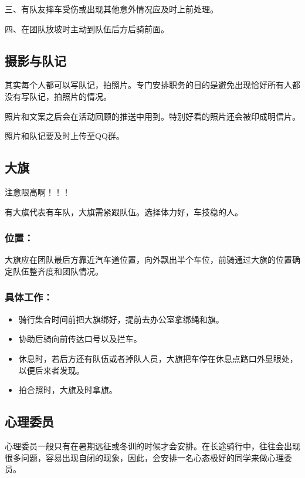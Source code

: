 \documentclass{ctexbook}
\begin{document}
三、有队友摔车受伤或出现其他意外情况应及时上前处理。

四、在团队放坡时主动到队伍后方后骑前面。



\subsection{摄影与队记}
其实每个人都可以写队记，拍照片。专门安排职务的目的是避免出现恰好所有人都没有写队记，拍照片的情况。

照片和文案之后会在活动回顾的推送中用到。特别好看的照片还会被印成明信片。

照片和队记要及时上传至QQ群。
\subsection{大旗}

注意限高啊！！！

有大旗代表有车队，大旗需紧跟队伍。选择体力好，车技稳的人。

\subsubsection{位置：}大旗应在团队最后方靠近汽车道位置，向外飘出半个车位，前骑通过大旗的位置确定队伍整齐度和团队情况。

\subsubsection{具体工作：}
\begin{itemize}

    \item 骑行集合时间前把大旗绑好，提前去办公室拿绑绳和旗。

    \item 协助后骑向前传达口号以及拦车。

    \item 休息时，若后方还有队伍或者掉队人员，大旗把车停在休息点路口外显眼处，以便后来者发现。

    \item 拍合照时，大旗及时拿旗。

\end{itemize}


\subsection{心理委员}
心理委员一般只有在暑期远征或冬训的时候才会安排。在长途骑行中，往往会出现很多问题，容易出现自闭的现象，因此，会安排一名心态极好的同学来做心理委员。
\end{document}
